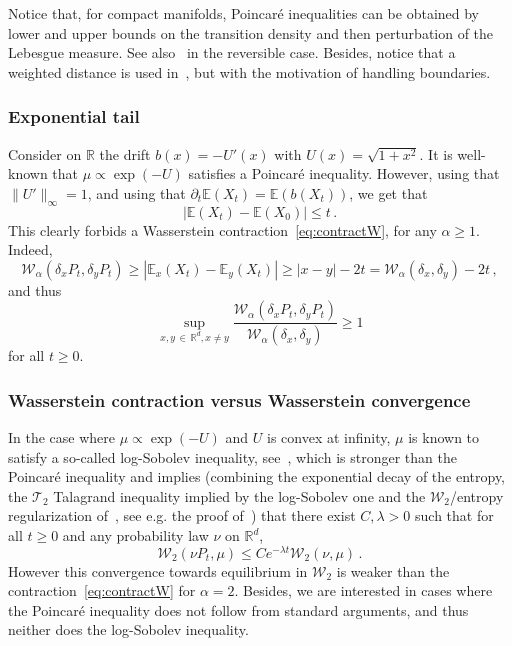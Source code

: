 \documentclass[AHL,Unicode,longabstracts,published]{cedram}
\newcommand{\R}{\mathbb R}
\newcommand{\bbE}{\mathbb E}
\newcommand{\clW}{\mathcal W}
\newcommand{\clT}{\mathcal T}
\newcommand{\1}{\mathbbm{1}}
\newcommand{\nv}[1]{#1}
\newcommand{\R}{\mathbb R}
\newcommand{\clW}{\mathcal W}
\begin{document}
Notice that, for compact manifolds, Poincaré inequalities can be obtained by lower and upper bounds on the transition density and then perturbation of the Lebesgue measure. See also~\cite{Wang2,Wang3} in the reversible case. Besides, notice that a weighted distance is used in~\cite{Wang3}, but with the motivation of handling boundaries.

\subsubsection*{Exponential tail}

Consider on $\R$ the drift $b(x) = - U'(x)$ with $U(x)=\sqrt{1+x^2}$. It is well-known that $\mu \propto \exp(-U)$ satisfies a Poincaré inequality. However, using that $\|U'\|_\infty = 1$, and using that $\partial_t \bbE (X_t) = \bbE(b(X_t))$, we get that
\[
\left|\bbE(X_t) - \bbE(X_0)\right| \leqslant t\,.
\]
This clearly forbids a Wasserstein contraction~\eqref{eq:contractW}, for any $\alpha\geqslant 1$. Indeed,
\[
\clW_\alpha\left(\delta_x P_t,\delta_y P_t\right) \geqslant \left|\bbE_x(X_t) - \bbE_y(X_t)\right| \geqslant |x-y| - 2t = \clW_\alpha\left(\delta_x,\delta_y\right)-2t\,,
\]
and thus
\[
\sup_{x,y\,\in\,\R^d,x\neq y} \frac{\clW_\alpha\left(\delta_x P_t,\delta_y P_t\right)}{\clW_\alpha(\delta_x,\delta_y)} \geqslant 1
\]
for all $t\geqslant 0$.

\subsubsection*{Wasserstein contraction versus Wasserstein convergence}



In the case where $\mu\propto \exp(-U)$ and $U$ is convex at infinity, $\mu$ is known to satisfy a so-called log-Sobolev inequality, see~\cite{BakryGentilLedoux}, which is stronger than the Poincaré inequality and implies (combining the exponential decay of the entropy, the $\clT_2$ Talagrand inequality implied by the log-Sobolev one and the $\clW_2$/entropy regularization of~\cite{RocknerWang}, see e.g. the proof of~\cite[Theorem~2]{MonmarcheGuillinVFP}) that there exist $C,\lambda>0$ such that for all $t\geqslant0$ and \nv{any} probability law $\nu$ on $\R^d$,
\[
\clW_2(\nu P_t,\mu) \leqslant C e^{-\lambda t} \clW_2(\nu,\mu)\,.
\]
However this convergence toward\nv{s} equilibrium in $\clW_2$ is weaker than the contraction~\eqref{eq:contractW} for $\alpha=2$. Besides, we are interested in cases where the Poincaré inequality does not follow from standard arguments, and thus neither does the log-Sobolev inequality.
\end{document}
